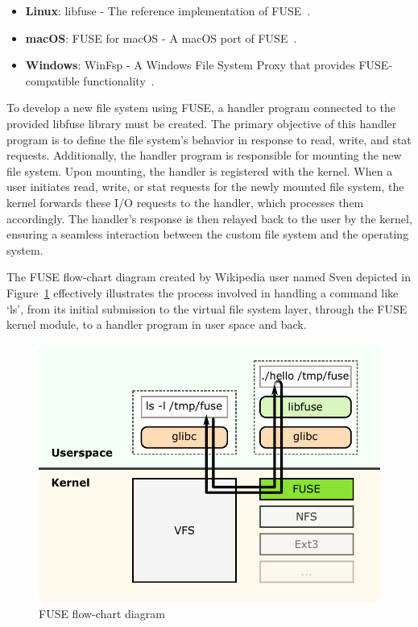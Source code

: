\begin{itemize}
    \item \textbf{Linux}: libfuse - The reference implementation of FUSE~\cite{libfuse}.
    \item \textbf{macOS}: FUSE for macOS - A macOS port of FUSE~\cite{osxfuse}.
    \item \textbf{Windows}: WinFsp - A Windows File System Proxy that provides FUSE-compatible functionality~\cite{winfsp}.
\end{itemize}

To develop a new file system using FUSE, a handler program connected to the provided libfuse library must be created.
The primary objective of this handler program is to define the file system's behavior in response to read, write, and stat requests.
Additionally, the handler program is responsible for mounting the new file system.
Upon mounting, the handler is registered with the kernel.
When a user initiates read, write, or stat requests for the newly mounted file system, the kernel forwards these I/O requests to the handler, which processes them accordingly.
The handler's response is then relayed back to the user by the kernel, ensuring a seamless interaction between the custom file system and the operating system.

The FUSE flow-chart diagram created by Wikipedia user named Sven\cite{fuse-diagram} depicted in Figure~\ref{fig:fuse-diagram} effectively illustrates the process involved in handling a command like `ls', from its initial submission to the virtual file system layer, through the FUSE kernel module, to a handler program in user space and back.

\begin{figure}[ht]
    \centering
    \includegraphics[width=0.8\linewidth]{img/fuse_diagram}
    \caption{FUSE flow-chart diagram}\label{fig:fuse-diagram}
\end{figure}

